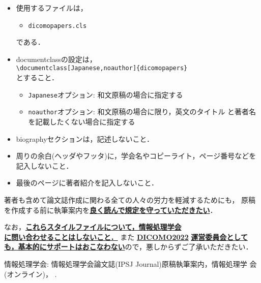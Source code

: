 \documentclass[Japanese]{dicomopapers}
\def\|{\verb|}
\begin{document}
\begin{itemize}%{
\item 使用するファイルは，
\begin{itemize}%{
\item[]\tt dicomopapers.cls
\end{itemize}%}
である．
\item documentclassの設定は，\\
      \|\documentclass[Japanese,noauthor]{dicomopapers}|\\
      とすること．
  \begin{itemize}
  \item {\tt Japanese}オプション: 和文原稿の場合に指定する
  \item {\tt noauthor}オプション: 和文原稿の場合に限り，英文のタイトル
  と著者名を記載したくない場合に指定する
  \end{itemize}
\item biographyセクションは，記述しないこと．
\item 周りの余白(ヘッダやフッタ)に，学会名やコピーライト，ページ番号などを記入しないこと．
\item 最後のページに著者紹介を記入しないこと．

\end{itemize}%

著者も含めて論文誌作成に関わる全ての人々の労力を軽減するためにも，
原稿を作成する前に執筆案内を\underline{\bf{良く読んで規定を守っていただきたい}}．

なお，\underline{\bf これらスタイルファイルについて，情報処理学会}\\
\underline{\bf に問い合わせることはしないこと．} また
\underline{\bf DICOMO2022}
\underline{\bf 運営委員会としても，基本的にサポートはおこなわない}ので，悪しからずご了承いただきたい．

\begin{thebibliography}{10}
情報処理学会: 情報処理学会論文誌(IPSJ Journal)原稿執筆案内，情報処理学
会(オンライン)，
.
\end{thebibliography}
\end{document}
